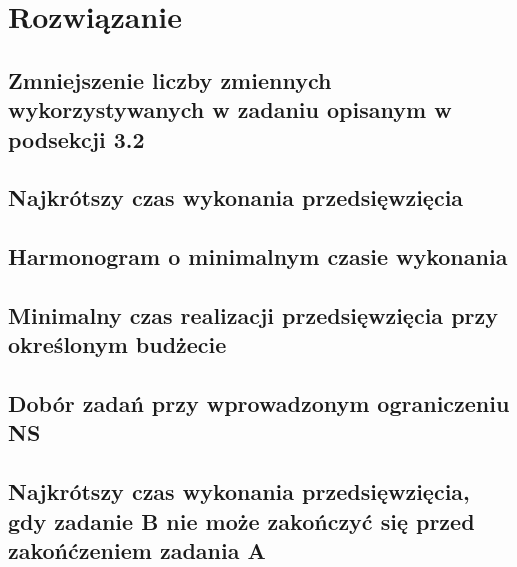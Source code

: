 \documentclass[
    12pt, %
]{../fphw}
\begin{document}
\section{Rozwiązanie}
\subsection{Zmniejszenie liczby zmiennych wykorzystywanych w zadaniu opisanym w podsekcji 3.2}
\subsection{Najkrótszy czas wykonania przedsięwzięcia}
\subsection{Harmonogram o minimalnym czasie wykonania}
\subsection{Minimalny czas realizacji przedsięwzięcia przy określonym budżecie}
\subsection{Dobór zadań przy wprowadzonym ograniczeniu NS}
\subsection{Najkrótszy czas wykonania przedsięwzięcia, gdy zadanie B nie może zakończyć się przed zakońćzeniem zadania A}
\lstlistoflistings
\listoffigures
\listoftables
\end{document}
